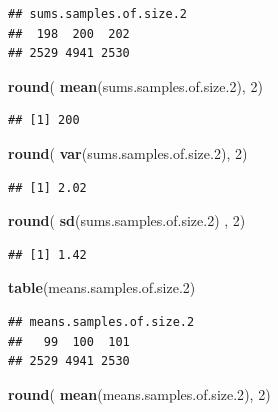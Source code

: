 \documentclass[]{book}
\newenvironment{Shaded}{\begin{snugshade}}{\end{snugshade}}
\newcommand{\DecValTok}[1]{\textcolor[rgb]{0.00,0.00,0.81}{#1}}
\newcommand{\FloatTok}[1]{\textcolor[rgb]{0.00,0.00,0.81}{#1}}
\newcommand{\KeywordTok}[1]{\textcolor[rgb]{0.13,0.29,0.53}{\textbf{#1}}}
\newcommand{\NormalTok}[1]{#1}
\begin{document}
\begin{verbatim}
## sums.samples.of.size.2
##  198  200  202 
## 2529 4941 2530
\end{verbatim}

\begin{Shaded}
\begin{Highlighting}[]
\KeywordTok{round}\NormalTok{( }\KeywordTok{mean}\NormalTok{(sums.samples.of.size}\FloatTok{.2}\NormalTok{), }\DecValTok{2}\NormalTok{)}
\end{Highlighting}
\end{Shaded}

\begin{verbatim}
## [1] 200
\end{verbatim}

\begin{Shaded}
\begin{Highlighting}[]
\KeywordTok{round}\NormalTok{( }\KeywordTok{var}\NormalTok{(sums.samples.of.size}\FloatTok{.2}\NormalTok{), }\DecValTok{2}\NormalTok{)}
\end{Highlighting}
\end{Shaded}

\begin{verbatim}
## [1] 2.02
\end{verbatim}

\begin{Shaded}
\begin{Highlighting}[]
\KeywordTok{round}\NormalTok{( }\KeywordTok{sd}\NormalTok{(sums.samples.of.size}\FloatTok{.2}\NormalTok{) , }\DecValTok{2}\NormalTok{)}
\end{Highlighting}
\end{Shaded}

\begin{verbatim}
## [1] 1.42
\end{verbatim}

\begin{Shaded}
\begin{Highlighting}[]
\KeywordTok{table}\NormalTok{(means.samples.of.size}\FloatTok{.2}\NormalTok{)}
\end{Highlighting}
\end{Shaded}

\begin{verbatim}
## means.samples.of.size.2
##   99  100  101 
## 2529 4941 2530
\end{verbatim}

\begin{Shaded}
\begin{Highlighting}[]
\KeywordTok{round}\NormalTok{( }\KeywordTok{mean}\NormalTok{(means.samples.of.size}\FloatTok{.2}\NormalTok{), }\DecValTok{2}\NormalTok{)}
\end{Highlighting}
\end{Shaded}
\end{document}
